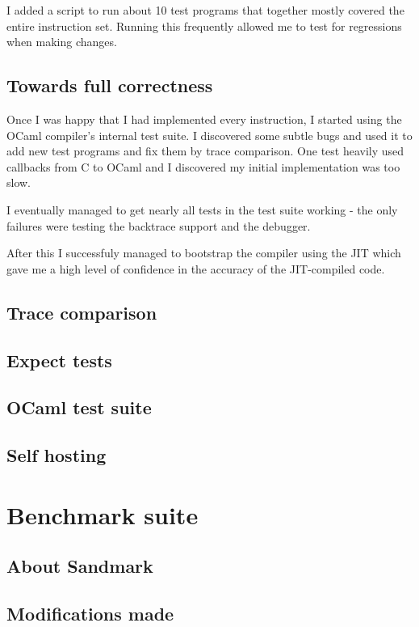 I added a script to run about 10 test programs that together mostly covered the entire instruction
set. Running this frequently allowed me to test for regressions when making changes.

\subsection{Towards full correctness}

Once I was happy that I had implemented every instruction, I started using
the OCaml compiler's internal test suite. I discovered some subtle bugs and used it to add new test
programs and fix them by trace comparison. One test heavily used callbacks from C to OCaml and I
discovered my initial implementation was too slow.

I eventually managed to get nearly all tests in the test suite working - the only failures were
testing the backtrace support and the debugger.

After this I successfuly managed to bootstrap the compiler using the JIT which gave me a high level
of confidence in the accuracy of the JIT-compiled code.

\subsection{Trace comparison}

\subsection{Expect tests}

\subsection{OCaml test suite}

\subsection{Self hosting}

\section{Benchmark suite}

\subsection{About Sandmark}

\subsection{Modifications made}

